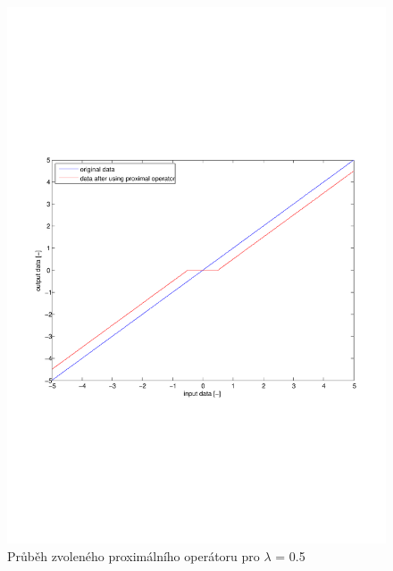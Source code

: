 \documentclass[FM,BP]{tulthesis}
\begin{document}
\begin{figure}[!ht]
\begin{center}
\includegraphics[scale=0.7]{obr/threshhold.pdf}
\end{center}
\caption{Průběh zvoleného proximálního operátoru pro $\lambda$ = 0.5}
\label{fig:threshhold}
\end{figure}
\end{document}
